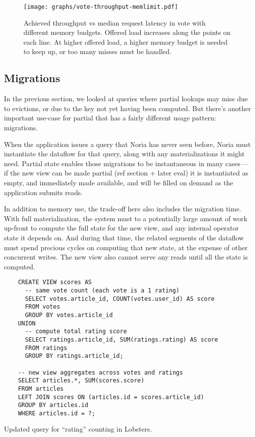 \begin{figure}[ht]
  \centering
  \texttt{[image: graphs/vote-throughput-memlimit.pdf]}
  \caption{Achieved throughput vs median request latency in vote with different
  memory budgets. Offered load increases along the points on each line. At
  higher offered load, a higher memory budget is needed to keep up, or too many
  misses must be handled.}
  \label{f:vote-throughput-memlimit}
\end{figure}

\subsection{Migrations}
\label{s:eval:cost:mig}

In the previous section, we looked at queries where partial lookups may miss due
to evictions, or due to the key not yet having been computed. But there's
another important use-case for partial that has a fairly different usage
pattern: migrations.

When the application issues a query that Noria has never seen before, Noria must
instantiate the dataflow for that query, along with any materializations it
might need. Partial state enables those migrations to be instantaneous in many
cases\,---\,if the new view can be made partial (ref section + later eval) it is
instantiated as empty, and immediately made available, and will be filled on
demand as the application submits reads.

In addition to memory use, the trade-off here also includes the migration time.
With full materialization, the system must to a potentially large amount of work
up-front to compute the full state for the new view, and any internal operator
state it depends on. And during that time, the related segments of the dataflow
must spend precious cycles on computing that new state, at the expense of other
concurrent writes. The new view also cannot serve any reads until all the state
is computed.

\begin{listing}[t]
  \begin{verbatim}
    CREATE VIEW scores AS
      -- same vote count (each vote is a 1 rating)
      SELECT votes.article_id, COUNT(votes.user_id) AS score
      FROM votes
      GROUP BY votes.article_id
    UNION
      -- compute total rating score
      SELECT ratings.article_id, SUM(ratings.rating) AS score
      FROM ratings
      GROUP BY ratings.article_id;

    -- new view aggregates across votes and ratings
    SELECT articles.*, SUM(scores.score)
    FROM articles
    LEFT JOIN scores ON (articles.id = scores.article_id)
    GROUP BY articles.id
    WHERE articles.id = ?;
  \end{verbatim}
  \caption{Updated query for ``rating'' counting in Lobsters.}
  \label{l:ratings}
\end{listing}

